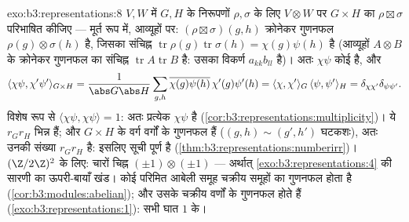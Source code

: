 \begin{solution}{exo:b3:representations:8}
$V, W$ में $G, H$ के निरूपणों $\rho, \sigma$ के लिए $V \otimes W$ पर $G \times H$ का 
$\rho \boxtimes \sigma$ परिभाषित कीजिए --- मूर्त रूप में, आव्यूहों पर: $(\rho\boxtimes
\sigma)(g,h)$ क्रोनेकर
गुणनफल $\rho(g)\otimes
\sigma(h)$ है, जिसका संचिह्न $\operatorname{tr}\rho(g)\operatorname{tr}\sigma(h) =
\chi(g)\psi(h)$ है (आव्यूहों $A \otimes B$ के क्रोनेकर
गुणनफल का संचिह्न $\operatorname{tr}A\operatorname{tr}B$ है: उसका विकर्ण $a_{kk}b_{ll}$ है)। अतः $\chi\psi$ कोई
 है, और
\[
\langle\chi\psi, \chi'\psi'\rangle_{G\times H}
= \frac{1}{\abs G\abs H}\sum_{g,h}
\overline{\chi(g)\psi(h)}\,\chi'(g)\psi'(h)
= \langle\chi,\chi'\rangle_G\,\langle\psi,\psi'\rangle_H
= \delta_{\chi\chi'}\delta_{\psi\psi'}.
\]
विशेष रूप से $\langle\chi\psi,\chi\psi\rangle = 1$: अतः प्रत्येक $\chi\psi$  है (\cref{cor:b3:representations:multiplicity})। ये $r_Gr_H$
भिन्न   हैं; और $G\times H$ के वर्ग वर्गों के गुणनफल हैं ($(g,h) \sim (g',h')$
घटकशः), अतः उनकी संख्या $r_Gr_H$ है: इसलिए सूची पूर्ण है (\cref{thm:b3:representations:numberirr})। $(\Z/2\Z)^2$
के लिए: चारों चिह्न  $(\pm1)\otimes(\pm1)$ --- अर्थात् \cref{exo:b3:representations:4} की सारणी का ऊपरी-बायाँ
खंड। कोई परिमित आबेली समूह चक्रीय समूहों का गुणनफल होता है (\cref{cor:b3:modules:abelian});
और उसके   चक्रीय वर्णों के गुणनफल होते हैं (\cref{exo:b3:representations:1}): सभी
घात $1$ के।
\end{solution}

